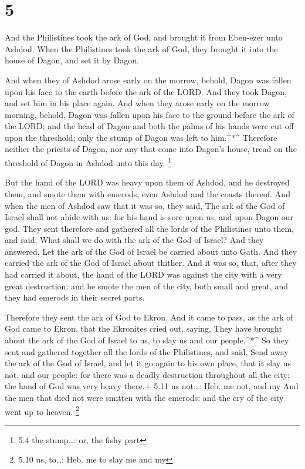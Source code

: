 \hypertarget{section-4}{%
\section{5}\label{section-4}}

 And the Philistines took the ark of God, and brought it
from Eben-ezer unto Ashdod.  When the Philistines took the
ark of God, they brought it into the house of Dagon, and set it by
Dagon.

 And when they of Ashdod arose early on the morrow, behold,
Dagon was fallen upon his face to the earth before the ark of the LORD.
And they took Dagon, and set him in his place again.  And
when they arose early on the morrow morning, behold, Dagon was fallen
upon his face to the ground before the ark of the LORD; and the head of
Dagon and both the palms of his hands were cut off upon the threshold;
only the stump of Dagon was left to him.\^{}*\^{}  Therefore
neither the priests of Dagon, nor any that come into Dagon's house,
tread on the threshold of Dagon in Ashdod unto this day. \footnote{5.4
  the stump\ldots: or, the fishy part}

 But the hand of the LORD was heavy upon them of Ashdod, and
he destroyed them, and smote them with emerods, even Ashdod and the
coasts thereof.  And when the men of Ashdod saw that it was
so, they said, The ark of the God of Israel shall not abide with us: for
his hand is sore upon us, and upon Dagon our god.  They sent
therefore and gathered all the lords of the Philistines unto them, and
said, What shall we do with the ark of the God of Israel? And they
answered, Let the ark of the God of Israel be carried about unto Gath.
And they carried the ark of the God of Israel about thither.
 And it was so, that, after they had carried it about, the
hand of the LORD was against the city with a very great destruction: and
he smote the men of the city, both small and great, and they had emerods
in their secret parts.

 Therefore they sent the ark of God to Ekron. And it came
to pass, as the ark of God came to Ekron, that the Ekronites cried out,
saying, They have brought about the ark of the God of Israel to us, to
slay us and our people.\^{}*\^{}  So they sent and gathered
together all the lords of the Philistines, and said, Send away the ark
of the God of Israel, and let it go again to his own place, that it slay
us not, and our people: for there was a deadly destruction throughout
all the city; the hand of God was very heavy there.+ 5.11 us not\ldots:
Heb. me not, and my  And the men that died not were smitten
with the emerods: and the cry of the city went up to heaven. \footnote{5.10
  us, to\ldots: Heb. me to slay me and my}

